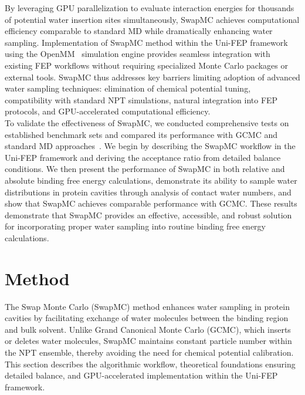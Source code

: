 \documentclass[journal=jacsat,manuscript=article]{achemso}
\begin{document}
By leveraging GPU parallelization to evaluate interaction energies for thousands of potential water insertion sites simultaneously, 
SwapMC achieves computational efficiency comparable to standard MD while dramatically enhancing water sampling. 
Implementation of SwapMC method within the Uni-FEP framework using the OpenMM~\cite{Eastman2023} simulation engine provides seamless integration with existing FEP workflows without requiring specialized Monte Carlo packages or external tools. 
SwapMC thus addresses key barriers limiting adoption of advanced water sampling techniques: elimination of chemical potential tuning, compatibility with standard NPT simulations, natural integration into FEP protocols, and GPU-accelerated computational efficiency. \\
\newline
To validate the effectiveness of SwapMC, we conducted comprehensive tests on established benchmark sets and compared its performance with GCMC and standard MD approaches~\cite{ross2020enhancing}. 
We begin by describing the SwapMC workflow in the Uni-FEP framework and deriving the acceptance ratio from detailed balance conditions. 
We then present the performance of SwapMC in both relative and absolute binding free energy calculations, 
demonstrate its ability to sample water distributions in protein cavities through analysis of contact water numbers, 
and show that SwapMC achieves comparable performance with GCMC. 
These results demonstrate that SwapMC provides an effective, accessible, and robust solution for incorporating proper water sampling into routine binding free energy calculations.
\section{Method}
The Swap Monte Carlo (SwapMC) method enhances water sampling in protein cavities by facilitating exchange of water molecules between the binding region and bulk solvent. 
Unlike Grand Canonical Monte Carlo (GCMC), which inserts or deletes water molecules, 
SwapMC maintains constant particle number within the NPT ensemble, 
thereby avoiding the need for chemical potential calibration. 
This section describes the algorithmic workflow, theoretical foundations ensuring detailed balance, 
and GPU-accelerated implementation within the Uni-FEP framework.
\end{document}
